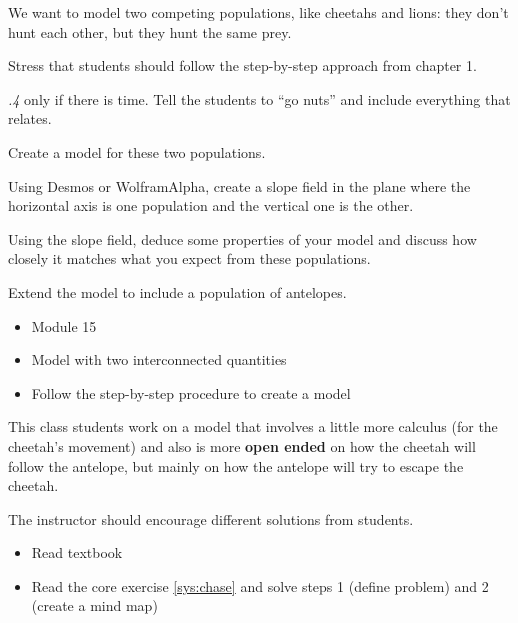 \question \label{sys:competition}
	We want to model two competing populations, like cheetahs and lions: they don't hunt each other, but they hunt the same prey.
\begin{annotation}
	\begin{goals}
		Stress that students should follow the step-by-step approach from chapter 1.
		
		\emph{.4} only if there is time. Tell the students to ``go nuts'' and include everything that relates.
	\end{goals}
\end{annotation}
\begin{parts}
	\item Create a model for these two populations.
	\item Using Desmos or WolframAlpha, create a slope field in the plane where the horizontal axis is one population and the vertical one is the other.
	\item Using the slope field, deduce some properties of your model and discuss how closely it matches what you expect from these populations.

	\item Extend the model to include a population of antelopes.	
\end{parts}





\bookonlynewpage

\begin{lesson}

	\begin{itemize}
		\item Module 15
	\end{itemize}

	\begin{itemize}
		\item Model with two interconnected quantities
		\item Follow the step-by-step procedure to create a model
	\end{itemize}
	

This class students work on a model that involves a little more calculus (for the cheetah's movement) and also is more \textbf{open ended} on how the cheetah will follow the antelope, but mainly on how the antelope will try to escape the cheetah. 

The instructor should encourage different solutions from students. 



\begin{itemize}
	\item Read textbook
	\item Read the core exercise \ref{sys:chase} and solve steps 1 (define problem) and 2 (create a mind map)
\end{itemize}

\end{lesson}



